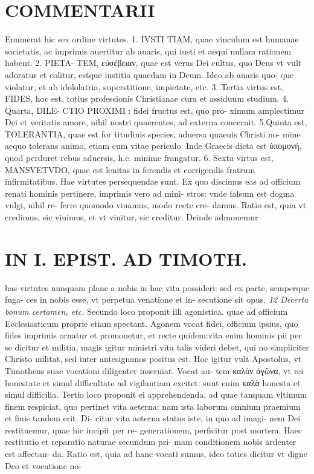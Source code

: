 \documentclass{article}
\begin{document}
\begin{pages}
\section*{COMMENTARII }
\marginpar{[ p.160 ]}\pstart Enumerat hic sex ordine virtutes. 1. IVSTI TIAM, quae vinculum est humanae societatis, ac imprimis auertitur ab auaris, qui iusti et aequi nullam rationem habent. 2. PIETA- TEM, εὐσέβειαν, quae est verus Dei cultus, quo Deus vt vult adoratur et colitur, estque iustitia quaedam in Deum. Ideo ab auaris quo- que violatur, et ab idololatria, superstitione, impietate, etc. 3. Tertia virtus est, FIDES, hoc est, totius professionis Christianae cura et assiduum studium. 4. Quarta, DILE- CTIO PROXIMI : fidei fructus est, quo pro- ximum amplectimur Dei et veritatis amore, nihil nostri quaerentes, ad externa concernit. 5.Quinta est, TOLERANTIA, quae est for titudinis species, aduersa quaeuis Christi no- mine aequo tolerans animo, etiam cum vitae periculo. Inde Graecis dicta est ὑπομονή, quod perduret rebus  aduersis, h.e. minime frangatur. 6. Sexta virtus est, MANSVETVDO, quae est lenitas in ferendis et corrigendis fratrum infirmitatibus. Hae virtutes persequendae sunt. Ex quo discimus eas ad officium renati hominis pertinere, imprimis vero ad mini- stros: vnde falsum est dogma vulgi, nihil re- ferre quomodo viuamus, modo recte cre- damus.  \pend\pstart Ratio est, quia vt credimus, sic viuimus, et vt viuitur, sic creditur. Deinde admonemur  \pend
\section*{IN I. EPIST. AD TIMOTH. }
\marginpar{[ p.161 ]}\pstart has virtutes nunquam plane a nobis in hac vita possideri: sed ex parte, semperque fuga- ces in nobis esse, vt perpetua venatione et in- secutione sit opus.  \pend
\textit{12 Decerta bonum certamen, etc. }\pstart Secundo loco proponit illi agonistica. quae ad officium Ecclesiasticum proprie etiam spectant. Agonem vocat fidei, officium ipsius, quo fides imprimis ornatur et promouetur, et recte quidem:vita enim hominis pii per se dicitur et militia, magis igitur ministri vita talis videri debet, qui no simpliciter Christo militat, sed inter antesignanos positus est. Hoc igitur vult Apostolus, vt Timotheus suae vocationi diligenter inseruiat. Vocat au- tem καλόν ἀγῶνα, vt rei honestate et simul difficultate ad vigilantiam excitet: sunt enim καλὰ honesta et simul difficilia.  \pend\pstart Tertio loco proponit ei apprehendenda, ad quae tanquam vltimum finem respiciat, quo pertinet vita aeterna: nam ista laborum omnium praemium et finis tandem erit. Di- citur vita aeterna status iste, in quo ad imagi- nem Dei restituemur, quae hic incipit per re- generationem, perficitur post mortem. Haec restitutio et reparatio naturae secundum pri- mam conditionem nobis ardenter est affectan- da. Ratio est, quia ad hanc vocati sumus, ideo toties dicitur vt digne Deo et vocatione no-  \pend

\end{pages}
\end{document}
